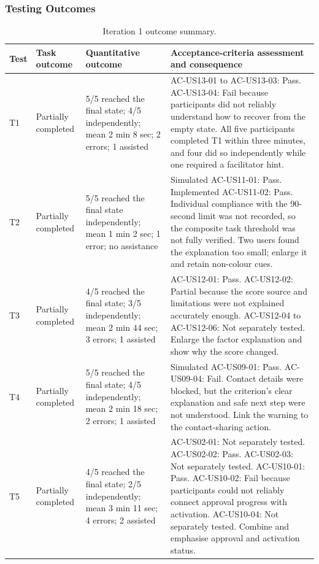 \documentclass[11pt,a4paper]{article}
\begin{document}
\subsubsection{Testing Outcomes}

\begin{table}[H]
    \centering
    \footnotesize
    \caption{Iteration 1 outcome summary.}
    \begin{tabularx}{\textwidth}{@{}L{0.7cm}L{1.4cm}L{3.6cm}Y@{}}
        \toprule
        Test & Task outcome & Quantitative outcome & Acceptance-criteria assessment and consequence\\
        \midrule
        T1 & Partially completed &
        5/5 reached the final state; 4/5 independently; mean 2 min 8 sec;
        2 errors; 1 assisted &
        AC-US13-01 to AC-US13-03: Pass. AC-US13-04: Fail because participants
        did not reliably understand how to recover from the empty state.
        All five participants completed T1 within three minutes, and four did so independently while one required a facilitator hint.\\
        T2 & Partially completed &
        5/5 reached the final state independently; mean 1 min 2 sec;
        1 error; no assistance &
        Simulated AC-US11-01: Pass. Implemented AC-US11-02: Pass. Individual
        compliance with the 90-second limit was not recorded, so the composite
        task threshold was not fully verified. Two users found the explanation
        too small; enlarge it and retain non-colour cues.\\
        T3 & Partially completed &
        4/5 reached the final state; 3/5 independently; mean 2 min 44 sec;
        3 errors; 1 assisted &
        AC-US12-01: Pass. AC-US12-02: Partial because the score source and
        limitations were not explained accurately enough. AC-US12-04 to
        AC-US12-06: Not separately tested. Enlarge the factor explanation and
        show why the score changed.\\
        T4 & Partially completed &
        5/5 reached the final state; 4/5 independently; mean 2 min 18 sec;
        2 errors; 1 assisted &
        Simulated AC-US09-01: Pass. AC-US09-04: Fail. Contact details were
        blocked, but the criterion's clear explanation and safe next step were
        not understood. Link the warning to the contact-sharing action.\\
        T5 & Partially completed &
        4/5 reached the final state; 2/5 independently; mean 3 min 11 sec;
        4 errors; 2 assisted &
        AC-US02-01: Not separately tested. AC-US02-02: Pass.
        AC-US02-03: Not separately tested. AC-US10-01: Pass.
        AC-US10-02: Fail because participants could not reliably connect
        approval progress with activation. AC-US10-04: Not separately tested.
        Combine and emphasise approval and activation status.\\
        \bottomrule
    \end{tabularx}
    \label{tabiterationoneoutcomes}
\end{table}
\end{document}
